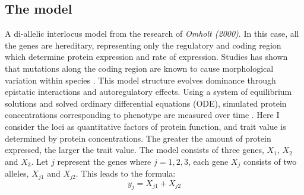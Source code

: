 \subsection{The model}
A di-allelic interlocus model from the research of \textit{Omholt (2000)}. In this case, all the genes are hereditary, representing only the regulatory and coding region which determine protein expression and rate of expression. Studies has shown that mutations along the coding region are known to cause morphological variation within species \cite{stern2009genetic}. This model structure evolves dominance through epistatic interactions and autoregulatory effects. Using a system of equilibrium solutions and solved ordinary differential equations (ODE), simulated protein concentrations corresponding to phenotype are measured over time \cite{omholt2000gene}. Here I consider the loci as quantitative factors of protein function, and trait value is determined by protein concentrations. The greater the amount of protein expressed, the larger the trait value. The model consists of three genes, $X_1$, $X_2$ and $X_3$. Let \(j\) represent the genes where $j = {1,2,3}$, each gene $X_j$ consists of two alleles, $X_{j1}$ and $X_{j2}$. This leads to the formula:
\begin{equation*}
    y_j = X_{j1}  + X_{j2} \label{eq:Protein Expression} \tag{1}
\end{equation*}

